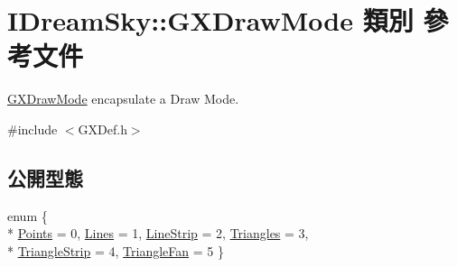 \hypertarget{class_i_dream_sky_1_1_g_x_draw_mode}{}\section{I\+Dream\+Sky\+:\+:G\+X\+Draw\+Mode 類別 參考文件}
\label{class_i_dream_sky_1_1_g_x_draw_mode}


\hyperlink{class_i_dream_sky_1_1_g_x_draw_mode}{G\+X\+Draw\+Mode} encapsulate a Draw Mode.  




{\ttfamily \#include $<$G\+X\+Def.\+h$>$}

\subsection*{公開型態}
\begin{DoxyCompactItemize}
\item 
enum \{ \\*
\hyperlink{class_i_dream_sky_1_1_g_x_draw_mode_a4f82f9452579607d7ee72b8102057bfda4095e3467f7891f426bd9f61aceda848}{Points} = 0, 
\hyperlink{class_i_dream_sky_1_1_g_x_draw_mode_a4f82f9452579607d7ee72b8102057bfdad8a65904098b9a723a7ca62233cd0eb8}{Lines} = 1, 
\hyperlink{class_i_dream_sky_1_1_g_x_draw_mode_a4f82f9452579607d7ee72b8102057bfda278dabc01e4871c5e1074c2ac196c058}{Line\+Strip} = 2, 
\hyperlink{class_i_dream_sky_1_1_g_x_draw_mode_a4f82f9452579607d7ee72b8102057bfda6d7403dc43fb3b3290ace68896626efe}{Triangles} = 3, 
\\*
\hyperlink{class_i_dream_sky_1_1_g_x_draw_mode_a4f82f9452579607d7ee72b8102057bfdaadae18f44cb8ca352626c6c80074dfe4}{Triangle\+Strip} = 4, 
\hyperlink{class_i_dream_sky_1_1_g_x_draw_mode_a4f82f9452579607d7ee72b8102057bfda5697f40902d09a3f4b4febbc383bbe01}{Triangle\+Fan} = 5
 \}
\end{DoxyCompactItemize}

